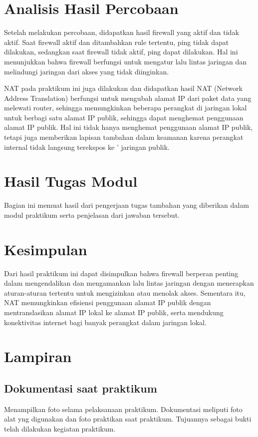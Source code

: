 \begin{enumerate}
    

    
    

\end{enumerate}

\section{Analisis Hasil Percobaan}
Setelah melakukan percobaan, didapatkan hasil firewall yang aktif dan tidak aktif. Saat firewall aktif dan ditambahkan rule tertentu, 
ping tidak dapat dilakukan, sedangkan saat firewall tidak aktif, ping dapat dilakukan. Hal ini menunjukkan 
bahwa firewall berfungsi untuk mengatur lalu lintas jaringan dan melindungi jaringan dari akses yang tidak diinginkan.

NAT pada praktikum ini juga dilakukan dan didapatkan hasil NAT (Network Address Translation) berfungsi untuk mengubah alamat IP dari paket data yang melewati router,
sehingga memungkinkan beberapa perangkat di jaringan lokal untuk berbagi satu alamat IP publik, sehingga dapat
menghemat penggunaan alamat IP publik. Hal ini tidak hanya menghemat penggunaan alamat IP publik, tetapi juga 
memberikan lapisan tambahan dalam keamanan karena perangkat internal tidak langsung terekspos ke '
jaringan publik.



\section{Hasil Tugas Modul}
Bagian ini memuat hasil dari pengerjaan tugas tambahan yang diberikan dalam modul praktikum serta penjelasan dari jawaban tersebut. 

\section{Kesimpulan}
Dari hasil praktikum ini dapat disimpulkan bahwa firewall berperan penting dalam mengendalikan dan 
mengamankan lalu lintas jaringan dengan menerapkan aturan-aturan tertentu untuk mengizinkan atau 
menolak akses. Sementara itu, NAT memungkinkan efisiensi penggunaan alamat IP publik dengan 
mentranslasikan alamat IP lokal ke alamat IP publik, serta mendukung konektivitas internet bagi 
banyak perangkat dalam jaringan lokal.


\section{Lampiran}
\subsection{Dokumentasi saat praktikum}
Menampilkan foto selama pelaksanaan praktikum. Dokumentasi meliputi foto alat yng digunakan dan foto praktikan saat praktikum. Tujuannya sebagai bukti telah dilakukan kegiatan praktikum.

